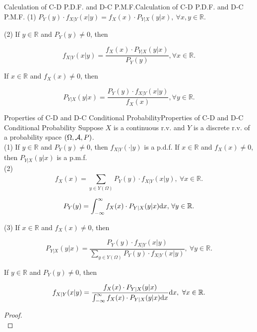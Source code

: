 \documentclass{elegantbook}
\begin{document}
\begin{remark}{Calculation of C-D P.D.F. and D-C P.M.F.}{Calculation of C-D P.D.F. and D-C P.M.F.}
(1)
\(P_{Y}(y) \cdot f_{X|Y}(x|y) = f_{X}(x) \cdot P_{Y|X}(y|x),\ \forall x,y \in \mathbb{R}.\)

(2) If \(y \in \mathbb{R}\) and \(P_{Y}(y) \neq 0\), then

\[f_{X|Y}(x|y) = \frac{f_{X}(x) \cdot P_{Y|X}(y|x)}{P_{Y}(y)},\forall x \in \mathbb{R}.\]

If \(x \in \mathbb{R}\) and \(f_{X}(x) \neq 0\), then

\[P_{Y|X}(y|x) = \frac{P_{Y}(y) \cdot f_{X|Y}(x|y)}{f_{X}(x)},\forall y \in \mathbb{R}.\]

\end{remark}

\begin{theorem}{Properties of C-D and D-C Conditional Probability}{Properties of C-D and D-C Conditional Probability}
Suppose \(X\) is a continuous r.v. and \(Y\) is a discrete r.v. of a probability space $(\Omega,\mathcal{A}, P)$.\\
(1) If \(y \in \mathbb{R}\) and \(P_{Y}(y) \neq 0\), then
\(f_{X|Y}\left( \cdot | y \right)\) is a p.d.f. If \(x \in \mathbb{R}\) and \(f_{X}(x) \neq 0\), then \(P_{Y|X}(y|x)\) is a p.m.f.\\
(2)
\[f_{X}(x) = \sum_{y \in Y(\Omega)}^{}{P_{Y}(y) \cdot f_{X|Y}(x|y)},\ \forall x \in \mathbb{R}.\]

\[P_{Y}(y) = \int_{- \infty}^{\infty}{f_{X}(x) \cdot P_{Y|X}(y|x)\dif x,}\ \forall y \in \mathbb{R}.\]

(3) If \(x \in \mathbb{R}\) and \(f_{X}(x) \neq 0\), then

\[P_{Y|X}(y|x) = \frac{P_{Y}(y) \cdot f_{X|Y}(x|y)}{\sum\limits_{y \in Y(\Omega)}^{}{P_{Y}(y) \cdot f_{X|Y}(x|y)}},\ \forall y \in \mathbb{R}.\]

If \(y \in \mathbb{R}\) and \(P_{Y}(y) \neq 0\), then

\[f_{X|Y}(x|y) = \frac{f_{X}(x) \cdot P_{Y|X}(y|x)}{\int_{- \infty}^{\infty}{f_{X}(x) \cdot P_{Y|X}(y|x)\dif x}}\dif x,\ \forall x \in \mathbb{R}.\]
\end{theorem}

\begin{proof}
\\[4cm]\vspace{0.01cm}
\end{proof}
\end{document}
